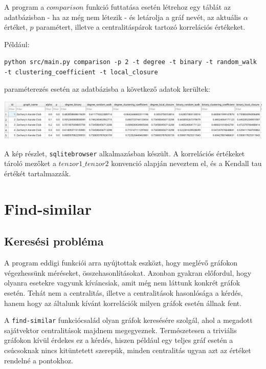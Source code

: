 \documentclass[12pt,numbers=noenddot]{report}
\begin{document}
A program a $comparison$ funkció futtatása esetén létrehoz egy táblát az 
adatbázisban - ha az még nem létezik - és letárolja a gráf nevét, az aktuális 
$\alpha$ értéket, $p$ paramétert, illetve a centralitáspárok tartozó korrelációs
értékeket.

\vspace{0.3cm}

\noindent
Például:

\texttt{python src/main.py comparison -p 2 -t degree -t binary -t random\_walk 
-t clustering\_coefficient -t local\_closure}

\noindent
paraméterezés esetén az adatbázisba a következő adatok kerültek:

\vspace{0.3cm}

\noindent
\includegraphics[width=\linewidth]{images/comparison_result.png}

\noindent
A kép részlet, \texttt{sqlitebrowser} alkalmazásban készült.
A korrelációs értékeket tároló mezőket a $tenzor1\_tenzor2$ konvenció alapján 
neveztem el, és a Kendall tau értékét tartalmazzák.

\pagebreak

\section{Find-similar}

\subsection{Keresési probléma}

A program eddigi funkciói arra nyújtottak eszközt, hogy meglévő gráfokon 
végezhessünk méréseket, összehasonlításokat. Azonban gyakran előfordul, hogy
olyanra esetekre vagyunk kíváncsiak, amit még nem láttunk konkrét gráfok esetén.
Tehát nem a centralitás, illetve a centralitások hasonlósága a kérdés, hanem
hogy az általunk kívánt korrelációk milyen gráfok esetén állnak fent.

A \texttt{find-similar} funkciócsalád olyan gráfok keresésére szolgál, ahol
a megadott sajátvektor centralitások majdnem megegyeznek. Természetesen a 
triviális gráfokon kívül érdekes ez a kérdés, hiszen például egy teljes gráf
esetén a csúcsoknak nincs kitüntetett szerepük, minden centralitás ugyan azt 
az értéket rendelné a pontokhoz.
\end{document}
